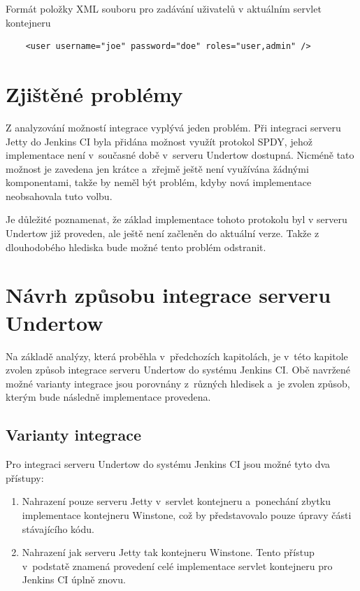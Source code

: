 \begin{priklad} \label{prUsers}
    Formát položky XML souboru pro zadávání uživatelů v aktuálním servlet kontejneru
\begin{verbatim}
    <user username="joe" password="doe" roles="user,admin" />
\end{verbatim}
\end{priklad}


    \section{Zjištěné problémy} \label{kapSpdy}
        Z analyzování možností integrace vyplývá jeden problém.
        Při integraci serveru Jetty do Jenkins CI byla přidána
        možnost využít protokol SPDY, jehož implementace
        není v~současné době v~serveru Undertow dostupná. Nicméně tato možnost
        je zavedena jen krátce a~zřejmě ještě není využívána žádnými komponentami,
        takže by neměl být problém, kdyby nová implementace neobsahovala tuto volbu.
        
        Je důležité poznamenat, že základ implementace tohoto protokolu byl v 
        serveru Undertow již proveden, ale ještě není začleněn do aktuální 
        verze. Takže z dlouhodobého hlediska bude možné tento problém odstranit.

    \section{Návrh způsobu integrace serveru Undertow} \label{secNavrh}
        Na základě analýzy, která proběhla v~předchozích kapitolách,
        je v~této kapitole zvolen způsob
        integrace serveru Undertow do systému Jenkins CI. 
        Obě navržené možné varianty integrace jsou porovnány z~různých
        hledisek a~je zvolen způsob, kterým bude následně implementace provedena.

                
        \subsection{Varianty integrace}
            Pro integraci serveru Undertow do systému Jenkins CI jsou možné tyto dva přístupy:

            \begin{enumerate}
                \item{Nahrazení pouze serveru Jetty v~servlet kontejneru a~ponechání
                    zbytku implementace kontejneru Winstone, což by představovalo
                    pouze úpravy části stávajícího kódu. }

                \item{Nahrazení jak serveru Jetty tak kontejneru Winstone. 
                    Tento přístup v~podstatě znamená provedení celé implementace
                    servlet kontejneru pro Jenkins CI úplně znovu.}
            \end{enumerate}

